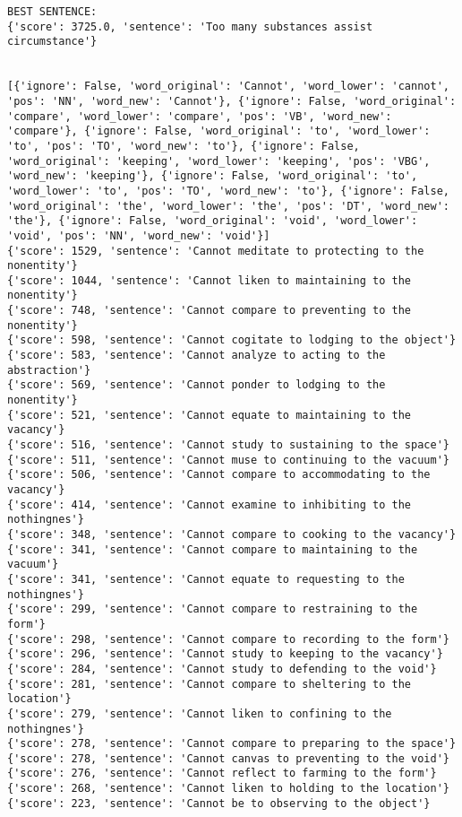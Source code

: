 \documentclass[12pt,a4paper,oneside]{book}
\begin{document}
\begin{verbatim}
BEST SENTENCE:
{'score': 3725.0, 'sentence': 'Too many substances assist circumstance'}


[{'ignore': False, 'word_original': 'Cannot', 'word_lower': 'cannot', 'pos': 'NN', 'word_new': 'Cannot'}, {'ignore': False, 'word_original': 'compare', 'word_lower': 'compare', 'pos': 'VB', 'word_new': 'compare'}, {'ignore': False, 'word_original': 'to', 'word_lower': 'to', 'pos': 'TO', 'word_new': 'to'}, {'ignore': False, 'word_original': 'keeping', 'word_lower': 'keeping', 'pos': 'VBG', 'word_new': 'keeping'}, {'ignore': False, 'word_original': 'to', 'word_lower': 'to', 'pos': 'TO', 'word_new': 'to'}, {'ignore': False, 'word_original': 'the', 'word_lower': 'the', 'pos': 'DT', 'word_new': 'the'}, {'ignore': False, 'word_original': 'void', 'word_lower': 'void', 'pos': 'NN', 'word_new': 'void'}]
{'score': 1529, 'sentence': 'Cannot meditate to protecting to the nonentity'}
{'score': 1044, 'sentence': 'Cannot liken to maintaining to the nonentity'}
{'score': 748, 'sentence': 'Cannot compare to preventing to the nonentity'}
{'score': 598, 'sentence': 'Cannot cogitate to lodging to the object'}
{'score': 583, 'sentence': 'Cannot analyze to acting to the abstraction'}
{'score': 569, 'sentence': 'Cannot ponder to lodging to the nonentity'}
{'score': 521, 'sentence': 'Cannot equate to maintaining to the vacancy'}
{'score': 516, 'sentence': 'Cannot study to sustaining to the space'}
{'score': 511, 'sentence': 'Cannot muse to continuing to the vacuum'}
{'score': 506, 'sentence': 'Cannot compare to accommodating to the vacancy'}
{'score': 414, 'sentence': 'Cannot examine to inhibiting to the nothingnes'}
{'score': 348, 'sentence': 'Cannot compare to cooking to the vacancy'}
{'score': 341, 'sentence': 'Cannot compare to maintaining to the vacuum'}
{'score': 341, 'sentence': 'Cannot equate to requesting to the nothingnes'}
{'score': 299, 'sentence': 'Cannot compare to restraining to the form'}
{'score': 298, 'sentence': 'Cannot compare to recording to the form'}
{'score': 296, 'sentence': 'Cannot study to keeping to the vacancy'}
{'score': 284, 'sentence': 'Cannot study to defending to the void'}
{'score': 281, 'sentence': 'Cannot compare to sheltering to the location'}
{'score': 279, 'sentence': 'Cannot liken to confining to the nothingnes'}
{'score': 278, 'sentence': 'Cannot compare to preparing to the space'}
{'score': 278, 'sentence': 'Cannot canvas to preventing to the void'}
{'score': 276, 'sentence': 'Cannot reflect to farming to the form'}
{'score': 268, 'sentence': 'Cannot liken to holding to the location'}
{'score': 223, 'sentence': 'Cannot be to observing to the object'}

\end{verbatim}
\end{document}
